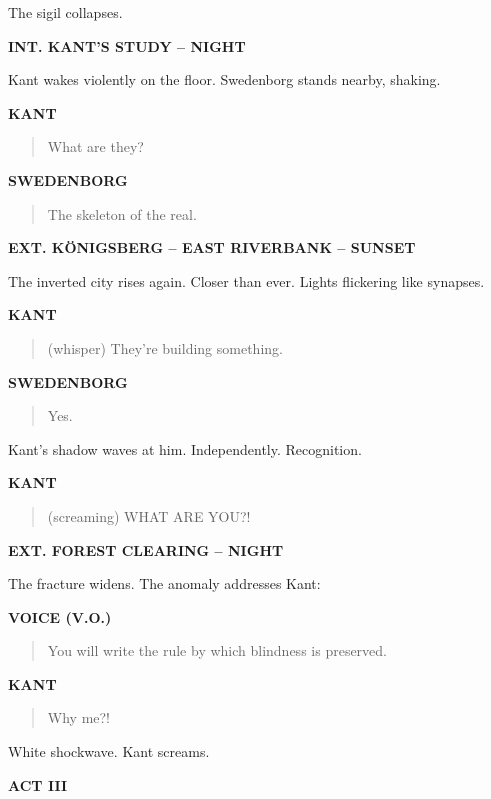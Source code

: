 \documentclass[12pt]{article}
\newcommand{\Scene}[1]{\vspace{1.2em}\textbf{#1}\vspace{0.8em}}
\newcommand{\Character}[1]{\vspace{0.8em}\textbf{#1}\vspace{0.4em}}
\newenvironment{Dialogue}{\begin{quote}\begin{RaggedRight}}{\end{RaggedRight}\end{quote}}
\newcommand{\Action}[1]{\vspace{0.4em}#1\vspace{0.4em}}
\begin{document}
\Action{The sigil collapses.}

\Scene{INT. KANT’S STUDY – NIGHT}

\Action{Kant wakes violently on the floor.  
Swedenborg stands nearby, shaking.}

\Character{KANT}
\begin{Dialogue}
What are they?
\end{Dialogue}

\Character{SWEDENBORG}
\begin{Dialogue}
The skeleton of the real.
\end{Dialogue}

\Scene{EXT. KÖNIGSBERG – EAST RIVERBANK – SUNSET}

\Action{The inverted city rises again.  
Closer than ever.  
Lights flickering like synapses.}

\Character{KANT}
\begin{Dialogue}
(whisper)  
They’re building something.
\end{Dialogue}

\Character{SWEDENBORG}
\begin{Dialogue}
Yes.
\end{Dialogue}

\Action{Kant’s shadow waves at him.  
Independently.  
Recognition.}

\Character{KANT}
\begin{Dialogue}
(screaming)  
WHAT ARE YOU?!
\end{Dialogue}

\Scene{EXT. FOREST CLEARING – NIGHT}

\Action{The fracture widens.  
The anomaly addresses Kant:}

\Character{VOICE (V.O.)}
\begin{Dialogue}
You will write the rule  
by which blindness is preserved.
\end{Dialogue}

\Character{KANT}
\begin{Dialogue}
Why me?!
\end{Dialogue}

\Action{White shockwave.  
Kant screams.}

\newpage
\begin{center}
{\Large\bfseries ACT III}
\end{center}
\newpage

\end{document}
